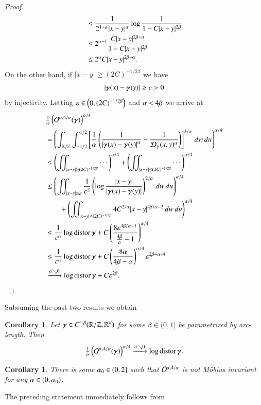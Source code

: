 \documentclass[a4paper,10pt,intlimits,ngerman]{amsart}
\newtheorem{corollary}[theorem]{Corollary}
\numberwithin{equation}{section}
\newcommand{\R}{\mathbb{R}}
\newcommand{\Z}{\mathbb{Z}}
\newcommand{\abs}[1]{\left | #1 \right |}
\newcommand{\eps}{\varepsilon}
\DeclareMathOperator{\distor}{distor}
\begin{document}
\begin{proof}
\begin{align*}
 &\le \frac1{2^{1-\alpha}|x-y|^{\alpha}}\log\frac1{1-C|x-y|^{2\beta}} \\
 &\le 2^{\alpha-1}\frac{C|x-y|^{2\beta-\alpha}}{1-C|x-y|^{2\beta}} \\
 &\le 2^{\alpha} C|x-y|^{2\beta-\alpha}.
 \end{align*}
 On the other hand, if $|x-y|\ge (2C)^{-1/2\beta}$ we have
 \[ \abs\D\ge c>0\]
 by injectivity.
 Letting $\eps\in\br{0,(2C)^{-1/2\beta}}$ and $\alpha<4\beta$
 we arrive at
 \begin{align*}
 &\tfrac1\a\br{\E(\g)}^{\a/4} \\
 &=\br{\int_{\R/\Z}\int_{-1/2}^{1/2}\sq{\frac1\a\br{\frac1{\abs{\D}^{\a}}-\frac1{\mathcal{D}_{\g}(x,y)^{\a}}}}^{2/\a}\d w\d u}^{\a/4} \\
 &\le\br{\iint_{|x-y|\ge(2C)^{-1/2\beta}}\cdots}^{\a/4}
 + \br{\iint_{|x-y|\le(2C)^{-1/2\beta}}\cdots}^{\a/4} \\
 &\le\br{\iint_{|x-y|\ge\eps} \frac1{c^{2}}\br{\log\frac{|x-y|}{\abs\D}}^{2/\a}\d w\d u}^{\a/4} \\
 &\qquad{}+ \br{\iint_{|x-y|\le(2C)^{-1/2\beta}}4C^{2/\a}|x-y|^{4\beta/\a-2}\d w\d u}^{\a/4} \\
 &\le \frac1{c^{\a}}\log\distor\g + C\br{\frac{8\eps^{4\beta/\a-1}}{\frac{4\beta}\a-1}}^{\a/4} \\
 &\le \frac1{c^{\a}}\log\distor\g + C\br{\frac{8\a}{{4\beta-\a}}}^{\a/4}\eps^{2\beta-\a/4} \\
 &\xrightarrow{\a\searrow0}\log\distor\g+C\eps^{2\beta}.
 \end{align*}
\end{proof}

Subsuming the past two results we obtain

\begin{corollary}
 Let $\g\in C^{1,\beta}\rzd$ for some $\beta\in(0,1]$
 be parametrized by arc-length. Then
 \[ \tfrac1\a\br{\E(\g)}^{\a/4}\xrightarrow{\a\searrow0}\log\distor\g. \]
\end{corollary}

\begin{corollary}\label{cor:alpha0}
 There is some $\alpha_{0}\in(0,2]$ such that
 $\mathcal{O}^{\alpha,4/\alpha}$ is \emph{not} M\"obius invariant for any $\alpha\in(0,\alpha_{0})$.
\end{corollary}

The preceding statement immediately follows from
\end{document}

